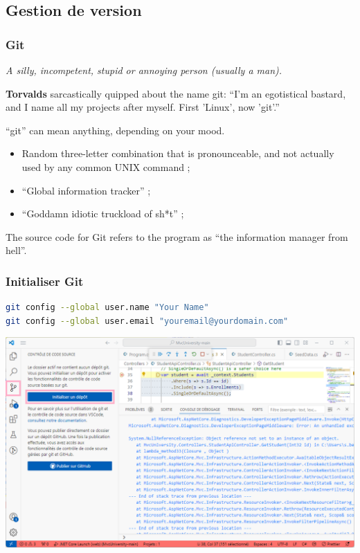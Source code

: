
\subsection{Gestion de version}
\label{subsec:cvs}

\begin{frame}
    \frametitle{Git}

    \emph{A silly, incompetent, stupid or annoying person (usually a man).}

    \textbf{Torvalds} sarcastically quipped about the name git:
    \enquote{I'm an egotistical bastard, and I name all my projects after myself. First 'Linux', now 'git'.}

    \enquote{git} can mean anything, depending on your mood.
    \begin{itemize}
        \item Random three-letter combination that is pronounceable, and not actually used by any common UNIX command ;
        \item \enquote{Global information tracker} ;
        \item \enquote{Goddamn idiotic truckload of sh*t} ;
    \end{itemize}

    The source code for Git refers to the program as \enquote{the information manager from hell}.
\end{frame}

\begin{frame}[fragile]
    \frametitle{Initialiser Git}

    \begin{lstlisting}[language=bash]
git config --global user.name "Your Name"
git config --global user.email "youremail@yourdomain.com"
    \end{lstlisting}

    \begin{center}
        \includegraphics[height=0.4\linewidth]{figures/environnement/git-init}
    \end{center}
\end{frame}

